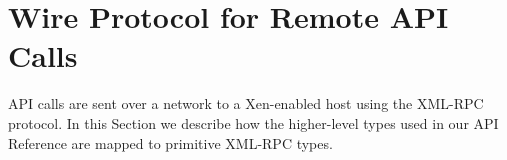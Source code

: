 %
%
%
%

\section{Wire Protocol for Remote API Calls}

API calls are sent over a network to a Xen-enabled host using
the XML-RPC protocol. In this Section we describe how the
higher-level types used in our API Reference are mapped to
primitive XML-RPC types.

